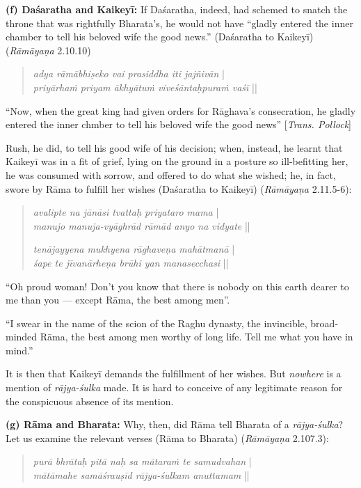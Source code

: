 \smallskip
\noindent
\textbf{(f) Daśaratha and Kaikeyī:} If Daśaratha, indeed, had schemed to snatch the throne that was rightfully Bharata’s, he would not have “gladly entered the inner chamber to tell his beloved wife the good news.” (Daśaratha to Kaikeyī) ({\sl Rāmāyaṇa} 2.10.10)
\begin{quote}
{{\sl adya rāmābhiṣeko vai prasiddha iti jajñivān}} |\\
{\sl priyārhaṁ priyam ākhyātuṁ viveśāntaḥpuraṁ vaśī} || 
\end{quote}

\begin{myquote}
“Now, when the great king had given orders for Rāghava’s consecration, he gladly entered the inner chmber to tell his beloved wife the good news” [{\sl Trans. Pollock}]
\end{myquote}

Rush, he did, to tell his good wife of his decision; when, instead, he learnt that Kaikeyī was in a fit of grief, lying on the ground in a posture so ill-befitting her, he was consumed with sorrow, and offered to do what she wished; he, in fact, swore by Rāma to fulfill her wishes (Daśaratha to Kaikeyī) ({\sl Rāmāyaṇa} 2.11.5-6): 
\begin{quote}
{{\sl avalipte na jānāsi tvattaḥ priyataro mama}} |\\
{\sl manujo manuja-vyāghrād rāmād anyo na vidyate} || 

{\sl tenājayyena mukhyena rāghaveṇa mahātmanā} |\\
{\sl śape te jīvanārheṇa brūhi yan manasecchasi} ||
\end{quote}

\begin{myquote}
“Oh proud woman! Don't you know that there is nobody on this earth dearer to me than you --- except Rāma, the best among men”.

“I swear in the name of the scion of the Raghu dynasty, the invincible, broad-minded Rāma, the best among men worthy of long life. Tell me what you have in mind.”
\end{myquote}

It is then that Kaikeyī demands the fulfillment of her wishes. But {\sl nowhere} is a mention of {\sl rājya-śulka} made. It is hard to conceive of any legitimate reason for the conspicuous absence of its mention.

\smallskip
\noindent
\textbf{(g) Rāma and Bharata:}  Why, then, did Rāma tell Bharata of a {\sl rājya-śulka}? Let us examine the relevant verses (Rāma to Bharata) ({\sl Rāmāyaṇa} 2.107.3):\\[-21pt] 
\begin{quote}
{{\sl purā bhrātaḥ pitā naḥ sa mātaraṁ te samudvahan}} |\\
{\sl mātāmahe samāśrauṣīd rājya-śulkam anuttamam} || 
\end{quote}

